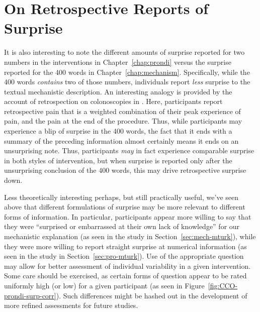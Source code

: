 
\section{On Retrospective Reports of Surprise}

It is also interesting to note the different amounts of surprise reported for
two numbers in the interventions in Chapter~\ref{chap:prondi} versus the
surprise reported for the 400 words in Chapter~\ref{chap:mechanism}.
Specifically, while the 400 words \emph{contains} two of those numbers,
individuals report \emph{less} surprise to the textual mechanistic description.
An interesting analogy is provided by the account of retrospection on
colonoscopies in \textcite{kahneman_perspective_2003}. Here, participants report
retrospective pain that is a weighted combination of their peak experience of
pain, and the pain at the end of the procedure. Thus, while participants may
experience a blip of surprise in the 400 words, the fact that it ends with a
summary of the preceding information almost certainly means it ends on an
unsurprising note.  Thus, participants \emph{may} in fact experience comparable surprise
in both styles of intervention, but when surprise is reported only after the
unsurprising conclusion of the 400 words, this may drive retrospective surprise
down.

Less theoretically interesting perhaps, but still practically useful, we've seen
above that different formulations of surprise may be more relevant to different
forms of information. In particular, participants appear more willing to say
that they were “surprised or embarrassed at their own lack of knowledge” for our
mechanistic explanation (as seen in the study in Section~\ref{sec:mech-mturk}),
while they were more willing to report straight surprise at numerical
information (as seen in the study in Section~\ref{sec:pro-mturk}). Use of the
appropriate question may allow for better assessment of individual variability
in a given intervention. Some care should be exercised, as certain forms
of question appear to be rated uniformly high (or low) for a given participant
(as seen in Figure~\ref{fig:CCO-prondi-surp-corr}). Such differences might be
hashed out in the development of more refined assessments for future studies.


